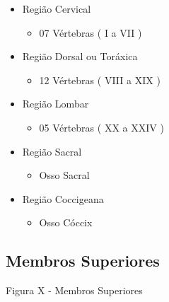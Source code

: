 \documentclass[
]{book}
\providecommand{\tightlist}{%
  \setlength{\itemsep}{0pt}\setlength{\parskip}{0pt}}
\begin{document}
\begin{itemize}
\tightlist
\item
  Região Cervical

  \begin{itemize}
  \tightlist
  \item
    07 Vértebras ( I a VII )
  \end{itemize}
\item
  Região Dorsal ou Toráxica

  \begin{itemize}
  \tightlist
  \item
    12 Vértebras ( VIII a XIX )
  \end{itemize}
\item
  Região Lombar

  \begin{itemize}
  \tightlist
  \item
    05 Vértebras ( XX a XXIV )
  \end{itemize}
\item
  Região Sacral

  \begin{itemize}
  \tightlist
  \item
    Osso Sacral
  \end{itemize}
\item
  Região Coccigeana

  \begin{itemize}
  \tightlist
  \item
    Osso Cóccix
  \end{itemize}
\end{itemize}

\hypertarget{membros-superiores}{%
\subsection{Membros Superiores}\label{membros-superiores}}

Figura X - Membros Superiores
\end{document}
